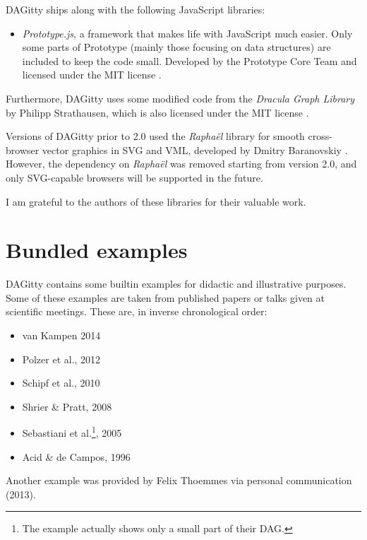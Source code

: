 \documentclass[a4paper,10pt]{article}
\newcommand{\pname}{{\sc DAG}itty\xspace}
\begin{document}
\pname ships along with the following JavaScript libraries:

\begin{itemize} 
 \item \emph{Prototype.js}, a framework that makes life with JavaScript much easier. Only some 
  parts of Prototype (mainly those focusing on data structures) are included to keep the code small. Developed
  by the Prototype Core Team and licensed under the MIT license \cite{Prototype2010}. 
\end{itemize}

Furthermore, \pname uses some modified code from the \emph{Dracula Graph Library} by 
Philipp Strathausen, which is also licensed under the MIT license \cite{Dracula2010}. 

Versions of \pname prior to 2.0 used the \emph{Rapha\"el} library for smooth 
cross-browser vector graphics in SVG and VML, developed by Dmitry Baranovskiy 
\cite{Raphael2010}. However, the dependency on \emph{Rapha\"el} was removed starting
from version 2.0, and only SVG-capable browsers will be supported in the future.

I am grateful to the authors of these libraries for their valuable work. 

\section{Bundled examples}

\pname contains some builtin examples for didactic and illustrative purposes. 
Some of these examples are taken from published papers or talks given at 
scientific meetings. These are, in inverse chronological order: 

\begin{itemize}
 \item van Kampen 2014 \cite{Kampen2014} 
 \item Polzer et al., 2012 \cite{Polzer2012}
 \item Schipf et al., 2010 \cite{Schipf2010}
 \item Shrier \& Pratt, 2008 \cite{ShrierP2008}
 \item Sebastiani et al.\footnote{The example actually shows only a small part of their DAG.}, 
    2005 \cite{Sebastiani2005}
 \item Acid \& de Campos, 1996 \cite{Acid1996}
\end{itemize}

Another example was provided by Felix Thoemmes 
via personal communication (2013).
\end{document}
